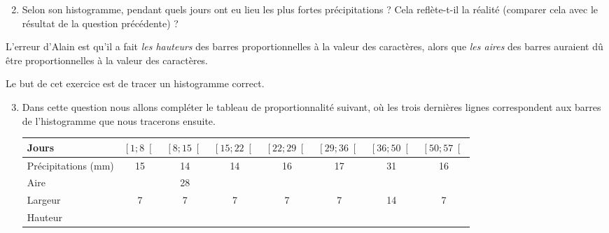 \documentclass[12pt]{article}
\begin{document}
\begin{exercice}
  \begin{center}
  \end{center}
  \begin{enumerate}
      \setcounter{enumi}{1}
    \item Selon son histogramme, pendant quels jours ont eu lieu les plus fortes précipitations ? Cela reflète-t-il la réalité (comparer cela avec le résultat de la question précédente) ?
  \end{enumerate}
  L'erreur d'Alain est qu'il a fait \emph{les hauteurs} des barres proportionnelles à
  la valeur des caractères, alors que \emph{les aires} des barres auraient dû être
  proportionnelles à la valeur des caractères.

  Le but de cet exercice est de tracer un histogramme correct.

  \begin{enumerate}
      \setcounter{enumi}{2}
    \item Dans cette question nous allons compléter le tableau de
      proportionnalité suivant, où les trois dernières lignes correspondent aux
      barres de l'histogramme que nous tracerons ensuite.

      \hspace{-3.5em}\begin{tabular}{p{2cm}||c|c|c|c|c|c|c}
    Jours &
    $\left[ 1; 8 \right[$ &
    $\left[ 8; 15 \right[$ &
    $\left[ 15; 22 \right[$ &
    $\left[ 22; 29 \right[$ &
    $\left[ 29; 36 \right[$ &
    $\left[ 36; 50 \right[$ &
    $\left[ 50; 57 \right[$ \\
          \hline
          \hline
          Précipita\-tions (mm) & 15 & 14 & 14 & 16 & 17 & 31 & 16 \\
          \hline
          \hline
          Aire &   & 28 & & & & \\
          \hline
          Largeur & 7 & 7& 7& 7& 7& 14& 7\\
          \hline
          Hauteur &&&&&&
        \end{tabular}


\end{enumerate}
\end{exercice}
\end{document}
